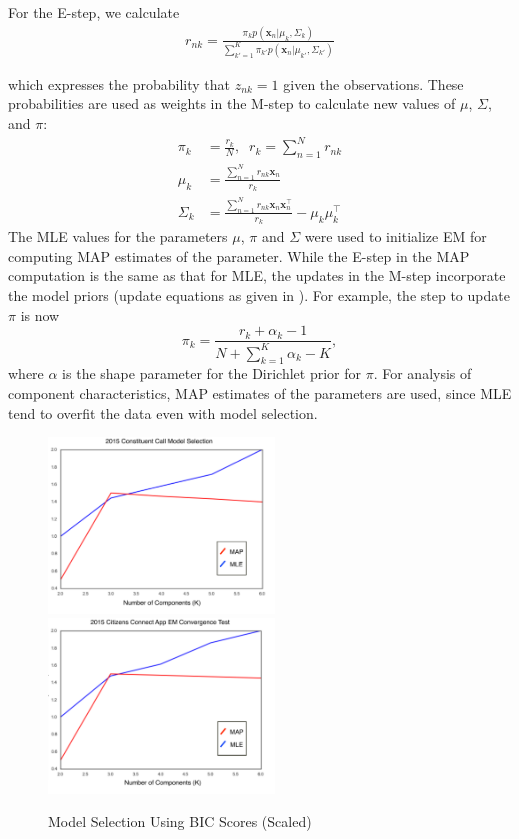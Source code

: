 \documentclass[twoside]{article}
\theoremstyle{theorem}
\theoremstyle{theorem}
\theoremstyle{theorem}
\theoremstyle{lemma}
\theoremstyle{definition}
\theoremstyle{example}
\begin{document}
For the E-step, we calculate   
\begin{align}
r_{nk} = \frac{\pi_k p\left(\mathbf{x}_n | \mu_k, \Sigma_k\right)}{\sum_{k'=1}^K \pi_{k'} p\left(\mathbf{x}_n | \mu_{k'}, \Sigma_{k'}\right)}
\end{align}

which expresses the probability that $z_{nk}=1$ given the observations. These probabilities are used as weights in the M-step to calculate new values of $\mu$, $\Sigma$, and $\pi$:
\begin{align}
\pi_k &= \frac{r_k}{N},\;\; r_k =\sum_{n=1}^N r_{nk}\\
\mu_k &=\frac{\sum_{n=1}^N r_{nk}\mathbf{x}_n}{r_k}\\
\Sigma_k &= \frac{\sum_{n=1}^N r_{nk} \mathbf{x}_n\mathbf{x}_n^\top}{r_k} - \mu_k\mu_k^\top
\end{align}
The MLE values for the parameters $\mu$, $\pi$ and $\Sigma$ were used to initialize EM for computing MAP estimates of the parameter. While the E-step in the MAP computation is the same as that for MLE, the updates in the M-step incorporate the model priors (update equations as given in \cite{Bishop}). For example, the step to update $\pi$ is now 
\begin{equation} 
\pi_k = \frac{r_k + \alpha_k - 1}{N + \sum_{k=1}^K \alpha_k - K},
\end{equation}
where $\alpha$ is the shape parameter for the Dirichlet prior for $\pi$. 
For analysis of component characteristics, MAP estimates of the parameters are used, since MLE tend to overfit the data even with model selection. 
\begin{figure}[h!]
\begin{center}
\includegraphics[width=60mm]{Call_bic}
\includegraphics[width=60mm]{App_bic}
\caption{Model Selection Using BIC Scores (Scaled)}\label{fig:bic}
\end{center}
\vskip -0.2in
\end{figure} 
\end{document}
